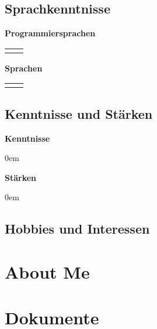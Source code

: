 \documentclass[
	a4paper,
	fontsize=12
]{scrartcl}
\begin{document}
\subsection{Sprachkenntnisse}
\begin{minipage}[t]{0.5\textwidth}
	\textbf{Programmiersprachen}\\\medskip
	\begin{tabularx}{\textwidth}{l!{\color{RoyalBlue}\vrule}X}
		\CVProgLangs
	\end{tabularx}
\end{minipage}
\begin{minipage}[t]{0.5\textwidth}
	\textbf{Sprachen}\\\medskip
	\begin{tabularx}{\textwidth}{l!{\color{RoyalBlue}\vrule}X}
		\CVNatLangs
	\end{tabularx}
\end{minipage}

\subsection{Kenntnisse und Stärken}
\begin{minipage}[t]{0.5\textwidth}
	\textbf{Kenntnisse}	
	\begin{itemize}\itemsep0em
		\CVKnowledge
	\end{itemize}
\end{minipage}
\begin{minipage}[t]{0.5\textwidth}
	\textbf{Stärken}
	\begin{itemize}\itemsep0em 
		\CVStrength
	\end{itemize}
\end{minipage}
\subsection{Hobbies und Interessen}
	\CVHobbiesInterests
\newpage

\endgroup %

\section{About Me}
\RecpSalutation
\bigskip

\CVAboutMe
\newpage


\section{Dokumente}
\end{document}
